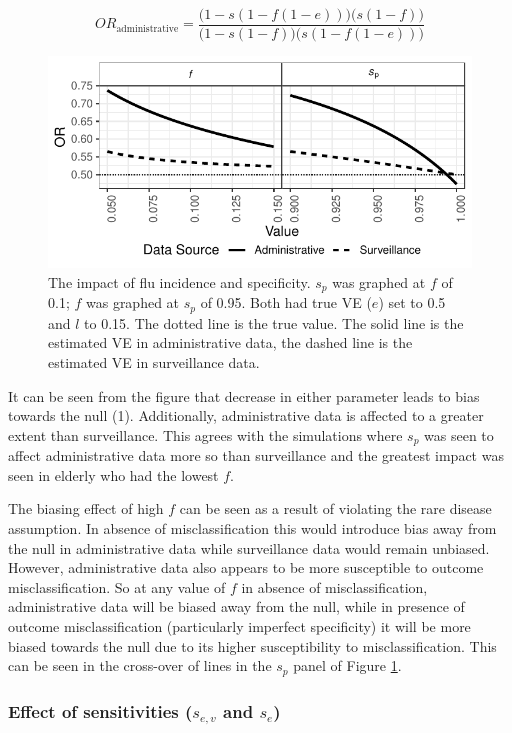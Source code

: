 \documentclass[11pt]{article}
\begin{document}
\begin{equation} \label{EqSFORAll}
OR_{\text{administrative}} = \frac{\Big(1-s(1-f(1-e))\Big)\Big(s(1-f)\Big)}{\Big(1-s(1-f)\Big)\Big(s(1-f(1-e))\Big)}
\end{equation}

\begin{figure}[h]
	\centering
		\includegraphics[width=0.75\linewidth]{../fig-sfinv/sfinv.pdf}
		\caption{
The impact of flu incidence and specificity. $s_p$ was graphed at $f$ of 0.1; $f$ was graphed at $s_p$ of 0.95. Both had true VE ($e$) set to 0.5 and $l$ to 0.15. The dotted line is the true value. The solid line is the estimated VE in administrative data, the dashed line is the estimated VE in surveillance data. \label{SFIPfGraph}
		}
\end{figure}

It can be seen from the figure that  decrease in either parameter leads to bias towards the null (1). Additionally, administrative data is affected to a greater extent than surveillance. This agrees with the simulations where $s_p$ was seen to affect administrative data more so than surveillance and the greatest impact was seen in elderly who had the lowest $f$.

The biasing effect of high $f$ can be seen as a result of violating the rare disease assumption. In absence of misclassification this would introduce bias away from the null in administrative data while surveillance data would remain unbiased. However, administrative data also appears to be more susceptible to outcome misclassification. So at any value of $f$ in absence of misclassification, administrative data will be biased away from the null, while in presence of outcome misclassification (particularly imperfect specificity) it will be more biased towards the null due to its higher susceptibility to misclassification. This can be seen in the cross-over of lines in the $s_p$ panel of Figure \ref{SFIPfGraph}.

\pagebreak

\subsubsection{Effect of sensitivities ($s_{e,v}$ and $s_e$)}
\end{document}
